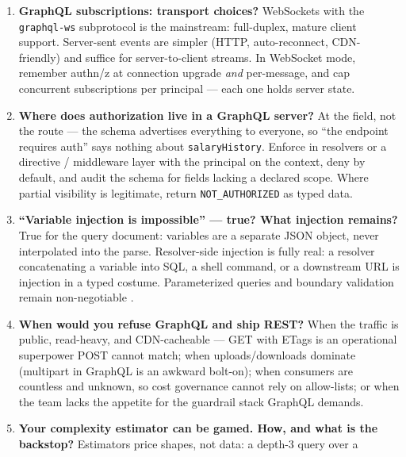 \begin{enumerate}[label=\textbf{Q\arabic*.}, leftmargin=2.6em]
        zero, then remove. When a truly breaking redesign is unavoidable,
        version the \emph{endpoint} (\texttt{/graphql/v2}) as a last
        resort. The philosophy trades REST's flag days for an eternal
        compatibility obligation --- backed by telemetry, or it is a
        guess.
  \item \textbf{GraphQL subscriptions: transport choices?}
        WebSockets with the \texttt{graphql-ws} subprotocol is the
        mainstream: full-duplex, mature client support. Server-sent
        events are simpler (HTTP, auto-reconnect, CDN-friendly) and
        suffice for server-to-client streams. In WebSocket mode, remember
        authn/z at connection upgrade \emph{and} per-message, and cap
        concurrent subscriptions per principal --- each one holds server
        state.
  \item \textbf{Where does authorization live in a GraphQL server?}
        At the field, not the route --- the schema advertises everything
        to everyone, so ``the endpoint requires auth'' says nothing about
        \texttt{salaryHistory}. Enforce in resolvers or a directive /
        middleware layer with the principal on the context, deny by
        default, and audit the schema for fields lacking a declared
        scope. Where partial visibility is legitimate, return
        \texttt{NOT\_AUTHORIZED} as typed data.
  \item \textbf{``Variable injection is impossible'' --- true? What
        injection remains?}
        True for the query document: variables are a separate JSON
        object, never interpolated into the parse. Resolver-side
        injection is fully real: a resolver concatenating a variable into
        SQL, a shell command, or a downstream URL is injection in a typed
        costume. Parameterized queries and boundary validation remain
        non-negotiable \cite{kleppmann2017ddia}.
  \item \textbf{When would you refuse GraphQL and ship REST?}
        When the traffic is public, read-heavy, and CDN-cacheable ---
        GET with ETags is an operational superpower POST cannot match;
        when uploads/downloads dominate (multipart in GraphQL is an
        awkward bolt-on); when consumers are countless and unknown, so
        cost governance cannot rely on allow-lists; or when the team
        lacks the appetite for the guardrail stack GraphQL demands.
  \item \textbf{Your complexity estimator can be gamed. How, and what is
        the backstop?}
        Estimators price shapes, not data: a depth-3 query over a

\end{enumerate}
